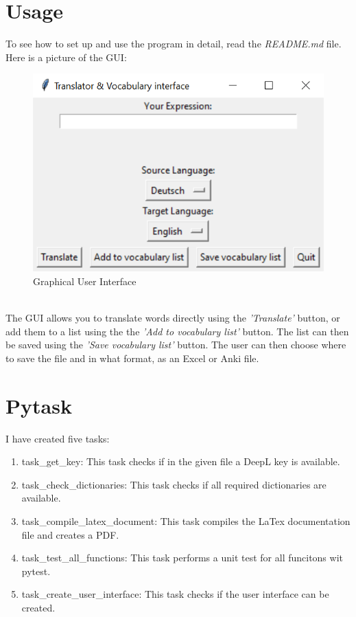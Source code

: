 \documentclass[11pt,a4paper,leqno]{article}
\theoremstyle{definition}
\begin{document}
    \section{Usage}
    To see how to set up and use the program in detail, read the \emph{README.md} file.\\
    Here is a picture of the GUI:\@
    \begin{figure}[h]
        \caption{Graphical User Interface}
        \includegraphics{GUI_screenshot.PNG}
    \end{figure}\\  
    The GUI allows you to translate words directly using the \emph{'Translate'} button, or add them to a list using the the \emph{'Add to vocabulary list'} button.
    The list can then be saved using the \emph{'Save vocabulary list'} button.
    The user can then choose where to save the file and in what format, as an Excel or Anki file.
    
    \newpage

    \section{Pytask}

    I have created five tasks:
    \begin{enumerate}
        \item task\_get\_key: This task checks if in the given file a DeepL key is available.
        \item task\_check\_dictionaries: This task checks if all required dictionaries are available.
        \item task\_compile\_latex\_document: This task compiles the LaTex documentation file and creates a PDF.
        \item task\_test\_all\_functions: This task performs a unit test for all funcitons wit pytest.
        \item task\_create\_user\_interface: This task checks if the user interface can be created.
    \end{enumerate}
\end{document}
